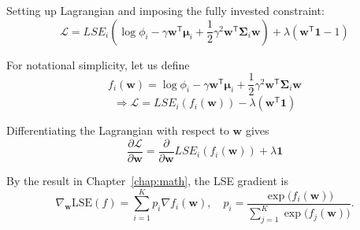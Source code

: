




Setting up Lagrangian and imposing the fully invested constraint:
$$\mathcal{L}=LSE_i\left(\log{\phi_{i}}-\gamma\mathbf{w}^{\mathsf{T}}\mathbf{\mu}_i+\frac{1}{2}\gamma^2\mathbf{w}^{\mathsf{T}}\mathbf{\Sigma}_i\mathbf{w}\right)+\lambda(\mathbf{w^{\mathsf{T}}1}-1)$$

For notational simplicity, let us define
$$f_i(\mathbf{w})=\log{\phi_{i}}-\gamma\mathbf{w}^{\mathsf{T}}\mathbf{\mu}_i+\frac{1}{2}\gamma^2\mathbf{w}^{\mathsf{T}}\mathbf{\Sigma}_i\mathbf{w}$$
$$\Longrightarrow \mathcal{L}=LSE_i(f_i(\mathbf{w}))-\lambda(\mathbf{w^{\mathsf{T}}1})$$

Differentiating the Lagrangian with respect to $\mathbf w$ gives
$$\frac{\partial\mathcal{L}}{\partial\mathbf{w}}=\frac{\partial}{\partial\mathbf{w}}LSE_i(f_i(\mathbf{w}))+\lambda\mathbf{1}$$

By the result in Chapter~\ref{chap:math}, the LSE gradient is
$$
\nabla_{\mathbf w}\mathrm{LSE}(f)
= \sum_{i=1}^K p_i\nabla f_i(\mathbf w),
\quad
p_i = \frac{\exp\bigl(f_i(\mathbf w)\bigr)}{\sum_{j=1}^K\exp\bigl(f_j(\mathbf w)\bigr)}.
$$


